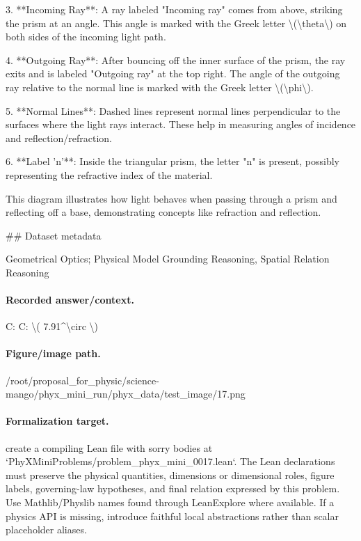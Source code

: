 3. **Incoming Ray**: A ray labeled "Incoming ray" comes from above, striking the prism at an angle. This angle is marked with the Greek letter \textbackslash{}(\textbackslash{}theta\textbackslash{}) on both sides of the incoming light path.

4. **Outgoing Ray**: After bouncing off the inner surface of the prism, the ray exits and is labeled "Outgoing ray" at the top right. The angle of the outgoing ray relative to the normal line is marked with the Greek letter \textbackslash{}(\textbackslash{}phi\textbackslash{}).

5. **Normal Lines**: Dashed lines represent normal lines perpendicular to the surfaces where the light rays interact. These help in measuring angles of incidence and reflection/refraction.

6. **Label 'n'**: Inside the triangular prism, the letter "n" is present, possibly representing the refractive index of the material.

This diagram illustrates how light behaves when passing through a prism and reflecting off a base, demonstrating concepts like refraction and reflection.

\#\# Dataset metadata

Geometrical Optics; Physical Model Grounding Reasoning, Spatial Relation Reasoning

\paragraph{Recorded answer/context.}
C: C: \textbackslash{}( 7.91\textasciicircum{}\textbackslash{}circ \textbackslash{})

\paragraph{Figure/image path.}
/root/proposal\_for\_physic/science-mango/phyx\_mini\_run/phyx\_data/test\_image/17.png

\paragraph{Formalization target.}
create a compiling Lean file with sorry bodies at `PhyXMiniProblems/problem\_phyx\_mini\_0017.lean`. The Lean declarations must preserve the physical quantities, dimensions or dimensional roles, figure labels, governing-law hypotheses, and final relation expressed by this problem.
Use Mathlib/Physlib names found through LeanExplore where available. If a physics API is missing, introduce faithful local abstractions rather than scalar placeholder aliases.

